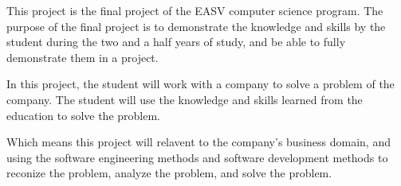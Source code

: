 
This project is the final project of the EASV computer science program. 
The purpose of the final project is to demonstrate the knowledge 
and skills by the student during the two and a half years of study,
and be able to fully demonstrate them in a project.

In this project, the student will work with a company 
to solve a problem of the company.
The student will use the knowledge and skills learned from the education
to solve the problem.

Which means this project will relavent to the company's business domain,
and using the software engineering methods and software development methods
to reconize the problem, analyze the problem, and solve the problem.

